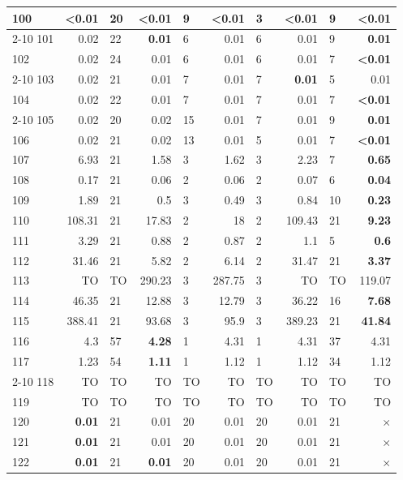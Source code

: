 \begin{longtable}{lr@{\hskip 4pt}l@{\hskip 12pt}r@{\hskip 4pt}l@{\hskip 12pt}r@{\hskip 4pt}l@{\hskip 12pt}r@{\hskip 4pt}l@{\hskip 12pt}r}
100 & \textbf{<0.01} & 20 & \textbf{<0.01} & 9 & \textbf{<0.01} & 3 & \textbf{<0.01} & 9 & \textbf{<0.01} \\
\cmidrule{2-10}
101 & 0.02 & 22 & \textbf{0.01} & 6 & 0.01 & 6 & 0.01 & 9 & \textbf{0.01} \\
102 & 0.02 & 24 & 0.01 & 6 & 0.01 & 6 & 0.01 & 7 & \textbf{<0.01} \\
\cmidrule{2-10}
103 & 0.02 & 21 & 0.01 & 7 & 0.01 & 7 & \textbf{0.01} & 5 & 0.01 \\
104 & 0.02 & 22 & 0.01 & 7 & 0.01 & 7 & 0.01 & 7 & \textbf{<0.01} \\
\cmidrule{2-10}
105 & 0.02 & 20 & 0.02 & 15 & 0.01 & 7 & 0.01 & 9 & \textbf{0.01} \\
106 & 0.02 & 21 & 0.02 & 13 & 0.01 & 5 & 0.01 & 7 & \textbf{<0.01} \\
\midrule
107 & 6.93 & 21 & 1.58 & 3 & 1.62 & 3 & 2.23 & 7 & \textbf{0.65} \\
108 & 0.17 & 21 & 0.06 & 2 & 0.06 & 2 & 0.07 & 6 & \textbf{0.04} \\
109 & 1.89 & 21 & 0.5 & 3 & 0.49 & 3 & 0.84 & 10 & \textbf{0.23} \\
110 & 108.31 & 21 & 17.83 & 2 & 18 & 2 & 109.43 & 21 & \textbf{9.23} \\
111 & 3.29 & 21 & 0.88 & 2 & 0.87 & 2 & 1.1 & 5 & \textbf{0.6} \\
112 & 31.46 & 21 & 5.82 & 2 & 6.14 & 2 & 31.47 & 21 & \textbf{3.37} \\
113 & TO & TO & 290.23 & 3 & 287.75 & 3 & TO & TO & 119.07 \\
114 & 46.35 & 21 & 12.88 & 3 & 12.79 & 3 & 36.22 & 16 & \textbf{7.68} \\
115 & 388.41 & 21 & 93.68 & 3 & 95.9 & 3 & 389.23 & 21 & \textbf{41.84} \\
116 & 4.3 & 57 & \textbf{4.28} & 1 & 4.31 & 1 & 4.31 & 37 & 4.31 \\
117 & 1.23 & 54 & \textbf{1.11} & 1 & 1.12 & 1 & 1.12 & 34 & 1.12 \\
\cmidrule{2-10}
118 & TO & TO & TO & TO & TO & TO & TO & TO & TO \\
119 & TO & TO & TO & TO & TO & TO & TO & TO & TO \\
\midrule
120 & \textbf{0.01} & 21 & 0.01 & 20 & 0.01 & 20 & 0.01 & 21 & $\times$ \\
121 & \textbf{0.01} & 21 & 0.01 & 20 & 0.01 & 20 & 0.01 & 21 & $\times$ \\
122 & \textbf{0.01} & 21 & \textbf{0.01} & 20 & 0.01 & 20 & 0.01 & 21 & $\times$ \\

\end{longtable}
